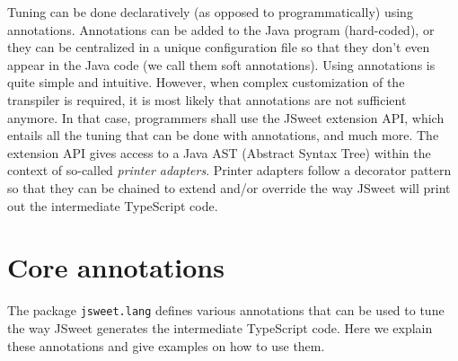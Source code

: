 \documentclass[a4paper]{report}
\begin{document}
Tuning can be done declaratively (as opposed to programmatically) using annotations. Annotations can be added to the Java program (hard-coded), or they can be centralized in a unique configuration file so that they don't even appear in the Java code (we call them soft annotations). Using annotations is quite simple and intuitive. However, when complex customization of the transpiler is required, it is most likely that annotations are not sufficient anymore. In that case, programmers shall use the JSweet extension API, which entails all the tuning that can be done with annotations, and much more. The extension API gives access to a Java AST (Abstract Syntax Tree) within the context of so-called \emph{printer adapters}. Printer adapters follow a decorator pattern so that they can be chained to extend and/or override the way JSweet will print out the intermediate TypeScript code.

\section{Core annotations}

The package \texttt{jsweet.lang} defines various annotations that can be used to tune the way JSweet generates the intermediate TypeScript code. Here we explain these annotations and give examples on how to use them.
\end{document}
